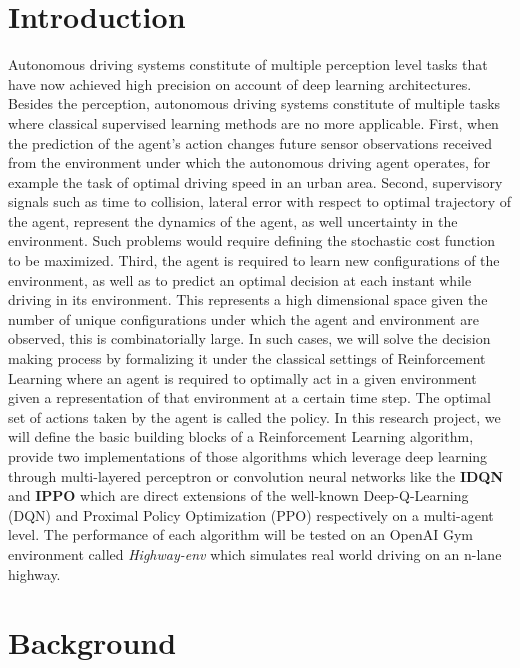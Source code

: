 \documentclass[conference]{IEEEtran}
\begin{document}
\section{Introduction}
Autonomous driving systems constitute of multiple perception level tasks that have now achieved high precision on account of deep learning architectures. 
Besides the perception, autonomous driving systems constitute of multiple tasks where classical supervised 
learning methods are no more applicable. First, when the prediction of the agent's action changes future 
sensor observations received from the environment under which the autonomous driving agent operates, for 
example the task of optimal driving speed in an urban area. Second, supervisory signals such as time 
to collision, lateral error with respect to optimal trajectory of the agent, represent the dynamics of the 
agent, as well uncertainty in the environment. Such problems would require defining the stochastic cost 
function to be maximized. Third, the agent is required to learn new configurations of the environment, as 
well as to predict an optimal decision at each instant while driving in its environment. 
This represents a high dimensional space given the number of unique configurations under which the agent and environment are observed, this is combinatorially
large. In such cases, we will solve the decision making process by formalizing it under the classical settings of Reinforcement Learning where an agent is required
to optimally act in a given environment given a representation of that environment at a certain time step. The optimal set of actions taken by the agent is called the policy.
In this research project, we will define the basic building blocks of a Reinforcement Learning algorithm, provide two implementations of those algorithms which leverage deep learning
through multi-layered perceptron or convolution neural networks like the \textbf{IDQN} and \textbf{IPPO} which are direct extensions of the well-known Deep-Q-Learning (DQN\cite{https://doi.org/10.48550/arxiv.1312.5602}) and Proximal Policy Optimization (PPO\cite{https://doi.org/10.48550/arxiv.1707.06347}) respectively on a multi-agent level.
The performance of each algorithm will be tested on an OpenAI Gym environment called \textit{Highway-env} which simulates real world driving on an n-lane highway.

\section{Background}
\end{document}
